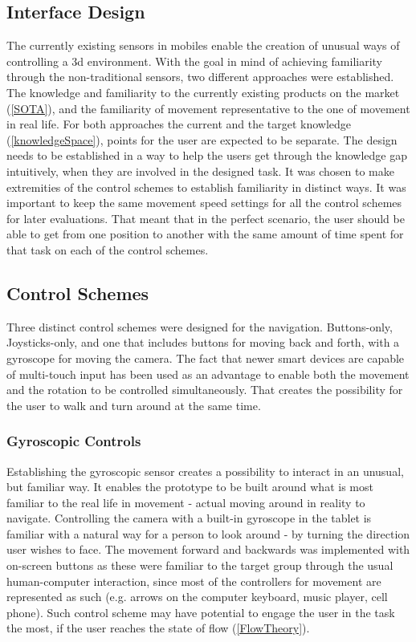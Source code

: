 \subsection{Interface Design}
The currently existing sensors in mobiles enable the creation of unusual ways of controlling a 3d environment. With the goal in mind of achieving familiarity through the non-traditional sensors, two different approaches were established. The knowledge and familiarity to the currently existing products on the market (\ref{SOTA}), and the familiarity of movement representative to the one of movement in real life. For both approaches the current and the target knowledge (\ref{knowledgeSpace}), points for the user are expected to be separate. The design needs to be established in a way to help the users get through the knowledge gap intuitively, when they are involved in the designed task. It was chosen to make extremities of the control schemes to establish familiarity in distinct ways. It was important to keep the same movement speed settings for all the control schemes for later evaluations. That meant that in the perfect scenario, the user should be able to get from one position to another with the same amount of time spent for that task on each of the control schemes.

\subsection{Control Schemes}
Three distinct control schemes were designed for the navigation. Buttons-only, Joysticks-only, and one that includes buttons for moving back and forth, with a gyroscope for moving the camera. The fact that newer smart devices are capable of multi-touch input has been used as an advantage to enable both the movement and the rotation to be controlled simultaneously. That creates the possibility for the user to walk and turn around at the same time.

\subsubsection{Gyroscopic Controls}
Establishing the gyroscopic sensor creates a possibility to interact in an unusual, but familiar way. It enables the prototype to be built around what is most familiar to the real life in movement - actual moving around in reality to navigate.
Controlling the camera with a built-in gyroscope in the tablet is familiar with a natural way for a person to look around - by turning the direction user wishes to face. The movement forward and backwards was implemented with on-screen buttons as these were familiar to the target group through the usual human-computer interaction, since most of the controllers for movement are represented as such (e.g. arrows on the computer keyboard, music player, cell phone).
Such control scheme may have potential to engage the user in the task the most, if the user reaches the state of flow (\ref{FlowTheory}).

